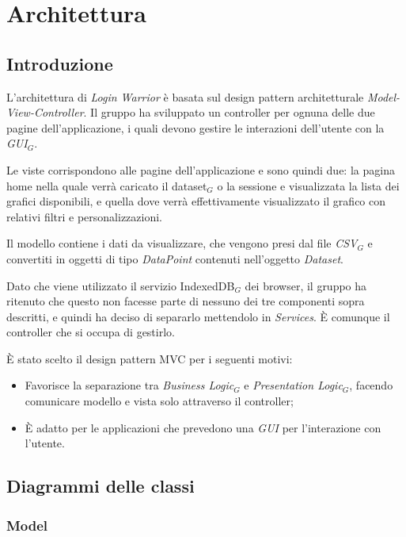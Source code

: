 \chapter{Architettura}
\section{Introduzione}
L'architettura di \textit{Login Warrior} è basata sul design pattern architetturale \textit{Model-View-Controller}. Il gruppo ha sviluppato un controller per ognuna delle due pagine dell'applicazione, i quali devono gestire le interazioni dell'utente con la \textit{GUI}$_G$.

 Le viste corrispondono alle pagine dell'applicazione e sono quindi due: la pagina home nella quale verrà caricato il dataset$_G$ o la sessione e visualizzata la lista dei grafici disponibili, e quella dove verrà effettivamente visualizzato il grafico con relativi filtri e personalizzazioni.

 Il modello contiene i dati da visualizzare, che vengono presi dal file \textit{CSV}$_G$ e convertiti in oggetti di tipo \textit{DataPoint} contenuti nell'oggetto \textit{Dataset}.

 Dato che viene utilizzato il servizio IndexedDB$_G$ dei browser, il gruppo ha ritenuto che questo non facesse parte di nessuno dei tre componenti sopra descritti, e quindi ha deciso di separarlo mettendolo in \textit{Services}. È comunque il controller che si occupa di gestirlo.


È stato scelto il design pattern MVC per i seguenti motivi:
\begin{itemize}
  \item Favorisce la separazione tra \textit{Business Logic}$_G$ e \textit{Presentation Logic}$_G$, facendo comunicare modello e vista solo attraverso il controller;
  \item È adatto per le applicazioni che prevedono una \textit{GUI} per l'interazione con l'utente.
\end{itemize}


\section{Diagrammi delle classi}
\subsection{Model}

